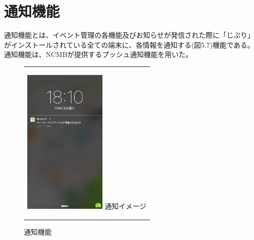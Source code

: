 \section{通知機能}%
通知機能とは、イベント管理の各機能及びお知らせが発信された際に「じぷり」がインストールされている全ての端末に、各情報を通知する(図5.7)機能である。通知機能は、NCMBが提供するプッシュ通知機能を用いた。

\begin{figure}[htbp]
  \begin{center}
    \begin{tabular}{c}

      \begin{minipage}{0.33\hsize}
        \begin{center}
\includegraphics[width=4cm]{notification.png}
          \hspace{1cm} %
          {\footnotesize 通知イメージ}
        \end{center}
      \end{minipage}

    \end{tabular}
    \caption{通知機能}
    \label{fig:lena}
  \end{center}
\end{figure}


